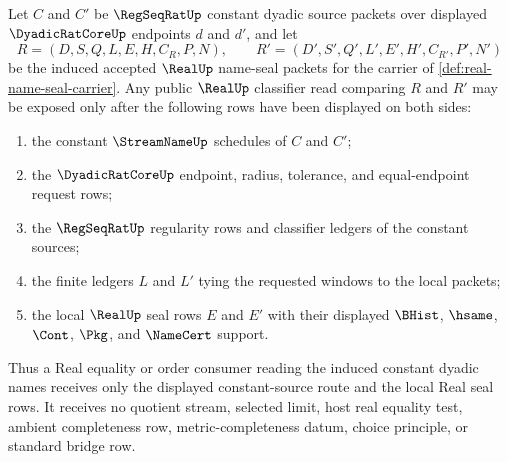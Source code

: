 \begin{theorem}
\label{thm:realup-dyadic-constant-classifier-handoff}
Let $C$ and $C'$ be $\RegSeqRatUp$ constant dyadic source packets over displayed $\DyadicRatCoreUp$ endpoints $d$ and $d'$, and let
$$
R=(D,S,Q,L,E,H,C_R,P,N),
\qquad
R'=(D',S',Q',L',E',H',C_{R'},P',N')
$$
be the induced accepted $\RealUp$ name-seal packets for the carrier of \autoref{def:real-name-seal-carrier}. Any public $\RealUp$ classifier read comparing $R$ and $R'$ may be exposed only after the following rows have been displayed on both sides:
\begin{enumerate}
\item the constant $\StreamNameUp$ schedules of $C$ and $C'$;
\item the $\DyadicRatCoreUp$ endpoint, radius, tolerance, and equal-endpoint request rows;
\item the $\RegSeqRatUp$ regularity rows and classifier ledgers of the constant sources;
\item the finite ledgers $L$ and $L'$ tying the requested windows to the local packets;
\item the local $\RealUp$ seal rows $E$ and $E'$ with their displayed $\BHist$, $\hsame$, $\Cont$, $\Pkg$, and $\NameCert$ support.
\end{enumerate}
Thus a Real equality or order consumer reading the induced constant dyadic names receives only the displayed constant-source route and the local Real seal rows. It receives no quotient stream, selected limit, host real equality test, ambient completeness row, metric-completeness datum, choice principle, or standard bridge row.
\end{theorem}
